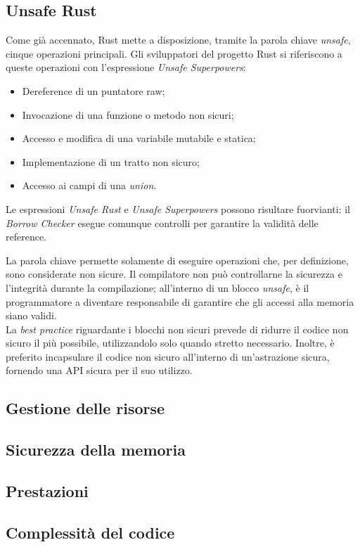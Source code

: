 \subsection*{Unsafe Rust}
Come già accennato, Rust mette a disposizione, tramite la parola chiave \textit{unsafe}, cinque operazioni principali. Gli sviluppatori
del progetto Rust si riferiscono a queste operazioni con l'espressione \textit{Unsafe Superpowers}:
\begin{itemize}
    \item Dereference di un puntatore raw;
    \item Invocazione di una funzione o metodo non sicuri;
    \item Accesso e modifica di una variabile mutabile e statica;
    \item Implementazione di un tratto non sicuro;
    \item Accesso ai campi di una \textit{union}.
\end{itemize}
Le espressioni \textit{Unsafe Rust} e \textit{Unsafe Superpowers} possono risultare fuorvianti: il \textit{Borrow Checker} esegue 
comunque controlli per garantire la validità delle reference. 

La parola chiave permette solamente di eseguire operazioni che, per definizione, sono considerate non sicure. 
Il compilatore non può controllarne la sicurezza e l'integrità durante la compilazione; all'interno di un blocco
 \textit{unsafe}, è il programmatore a diventare responsabile di garantire che gli accessi alla memoria
siano validi. \hfill
\vspace{12pt}\\
\noindent La \textit{best practice} riguardante i blocchi non sicuri prevede di ridurre il codice non sicuro il più possibile, utilizzandolo solo quando stretto necessario.
Inoltre, è preferito incapsulare il codice non sicuro all'interno di un'astrazione sicura, fornendo una API sicura per il suo utilizzo. \hfill
\subsection{Gestione delle risorse}
\subsection{Sicurezza della memoria}
\subsection{Prestazioni}
\subsection{Complessità del codice}
